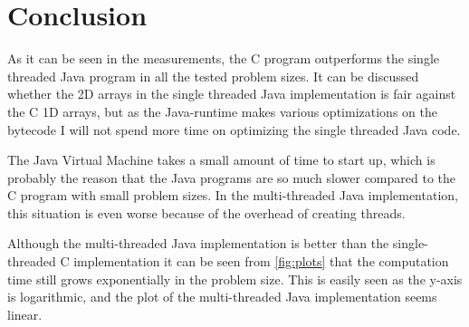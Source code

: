 \documentclass{article}
\begin{document}
	\section{Conclusion}
	As it can be seen in the measurements, the C program outperforms the single threaded Java program in all the tested problem sizes. It can be discussed whether the 2D arrays in the single threaded Java implementation is fair against the C 1D arrays, but as the Java-runtime makes various optimizations on the bytecode I will not spend more time on optimizing the single threaded Java code.
	
	The Java Virtual Machine takes a small amount of time to start up, which is probably the reason that the Java programs are so much slower compared to the C program with small problem sizes. In the multi-threaded Java implementation, this situation is even worse because of the overhead of creating threads.

	Although the multi-threaded Java implementation is better than the single-threaded C implementation it can be seen from \autoref{fig:plots} that the computation time still grows exponentially in the problem size. This is easily seen as the y-axis is logarithmic, and the plot of the multi-threaded Java implementation seems linear.
\end{document}
